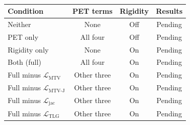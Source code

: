 \begin{table}[htbp]
\journalcolor
\centering
\caption{}
\label{tab:journal_ablations}
\small
\setlength{\tabcolsep}{4pt}
\begin{tabular}{lccc}
\toprule
Condition & PET terms & Rigidity & Results \\
\midrule
Neither & None & Off & Pending \\
PET only & All four & Off & Pending \\
Rigidity only & None & On & Pending \\
Both (full) & All four & On & Pending \\
\midrule
Full minus $\mathcal{L}_{\mathrm{MTV}}$ & Other three & On & Pending \\
Full minus $\mathcal{L}_{\mathrm{MTV\text{-}J}}$ & Other three & On & Pending \\
Full minus $\mathcal{L}_{\mathrm{jac}}$ & Other three & On & Pending \\
Full minus $\mathcal{L}_{\mathrm{TLG}}$ & Other three & On & Pending \\
\bottomrule
\end{tabular}
\end{table}
